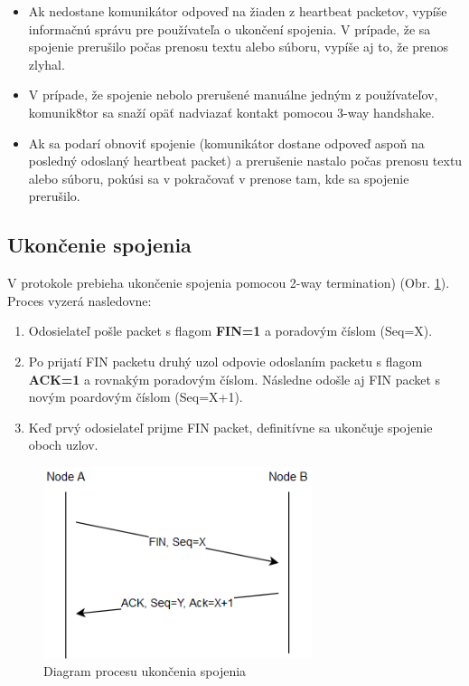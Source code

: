 \documentclass[a4paper,12pt]{article}
\begin{document}
	\begin{itemize}
	\item Ak nedostane komunikátor odpoveď na žiaden z heartbeat packetov, vypíše informačnú správu pre používateľa o ukončení spojenia. V prípade, že sa spojenie prerušilo počas prenosu textu alebo súboru, vypíše aj to, že prenos zlyhal.
	\item V prípade, že spojenie nebolo prerušené manuálne jedným z používateľov, komunik8tor sa snaží opäť nadviazať kontakt pomocou 3-way handshake.
	\item Ak sa podarí obnoviť spojenie (komunikátor dostane odpoveď aspoň na posledný odoslaný heartbeat packet) a prerušenie nastalo počas prenosu textu alebo súboru, pokúsi sa v pokračovať v prenose tam, kde sa spojenie prerušilo.
   	\end{itemize}

	\subsection{Ukončenie spojenia}
		V protokole prebieha ukončenie spojenia pomocou 2-way termination) (Obr. \ref{fig:disconnect_diagram}). Proces vyzerá nasledovne:
		\begin{enumerate}
			\item Odosielateľ pošle packet s flagom \textbf{FIN=1} a poradovým číslom (Seq=X).
			\item Po prijatí FIN packetu druhý uzol odpovie odoslaním packetu s flagom \textbf{ACK=1} a rovnakým poradovým číslom. Následne odošle aj FIN packet s novým poardovým číslom (Seq=X+1).
			\item Keď prvý odosielateľ prijme FIN packet, definitívne sa ukončuje spojenie oboch uzlov.

		\end{enumerate}
			
		\begin{figure}[h]
		    \centering
		    \includegraphics[width=0.70\textwidth]{disconnect_diagram.png}
		    \caption{Diagram procesu ukončenia spojenia}
		    \label{fig:disconnect_diagram}
		\end{figure}
\end{document}
